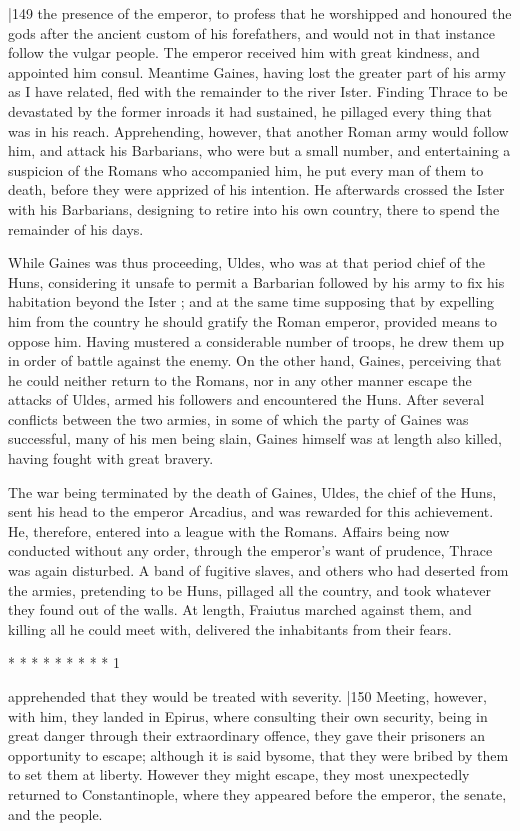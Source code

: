 |149 the presence of the emperor, to profess that he worshipped and honoured the gods after the ancient custom of his forefathers, and would not in that instance follow the vulgar people. The emperor received him with great kindness, and appointed him consul. Meantime Gaines, having lost the greater part of his army
as I have related, fled with the remainder to the river Ister. Finding Thrace to be devastated by the former inroads it had sustained, he pillaged every thing that was in his reach. Apprehending, however, that another Roman army would follow him, and attack his Barbarians, who were but a small number, and entertaining a suspicion of the Romans who accompanied him, he put every man of them to death, before they were apprized of his intention. He afterwards crossed the Ister with his Barbarians, designing to retire into his own country, there to spend the remainder of his days.

While Gaines was thus proceeding, Uldes, who was at that period chief of the Huns, considering it unsafe to permit a Barbarian followed by his army to fix his habitation beyond the Ister ; and at the same time supposing that by expelling him from the country he should gratify the Roman emperor, provided means to oppose him. Having mustered a considerable number of troops, he drew them up in order of battle against the enemy. On the other hand, Gaines, perceiving that he could neither return to the Romans, nor in any other manner escape the attacks of Uldes, armed his followers and encountered the Huns. After several conflicts between the two armies, in some of which the party of Gaines was successful, many of his men being slain, Gaines himself was at length also killed, having fought with great bravery.

The war being terminated by the death of Gaines, Uldes, the chief of the Huns, sent his head to the emperor Arcadius, and was rewarded for this achievement. He, therefore, entered into a league with the Romans. Affairs being now conducted without any order, through the emperor's want of prudence, Thrace was again disturbed. A band of fugitive slaves, and others who had deserted from the armies, pretending to be Huns, pillaged all the country, and took whatever they found out of the walls. At length, Fraiutus marched against them, and killing all he could meet with, delivered the inhabitants from their fears.

* * * * * * * * * 1

apprehended that they would be treated with severity. |150
Meeting, however, with him, they landed in Epirus, where consulting their own security, being in great danger through their extraordinary offence, they gave their prisoners an opportunity to escape; although it is said by\emph{}some, that they were bribed by them to set them at liberty. However they might escape, they most unexpectedly returned to Constantinople, where they appeared before the emperor, the senate, and the people.

